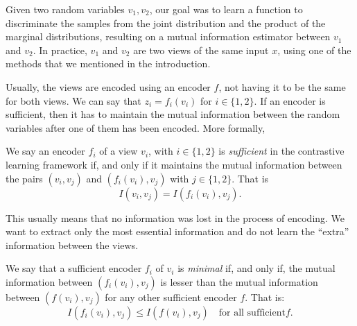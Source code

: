 Given two random variables $v_1,v_2$, our goal was to learn a function to discriminate the samples from the joint distribution and the product of the marginal distributions, resulting on a mutual information estimator between $v_1$ and $v_2$. In practice, $v_1$ and $v_2$ are two views of the same input $x$, using one of the methods that we mentioned in the introduction.

Usually, the views are encoded using an encoder $f$, not having it to be the same for both views. We can say that $z_i = f_i(v_i)$ for $i \in \{1,2\}$. If an encoder is sufficient, then it has to maintain the mutual information between the random variables after one of them has been encoded. More formally,

\begin{ndef}
We say an encoder $f_i$ of a view $v_i$, with $i \in \{1,2\}$ is \emph{sufficient} in the contrastive learning framework if, and only if it maintains the mutual information between the pairs $(v_i,v_j)$ and $(f_i(v_i),v_j)$ with $j \in \{1,2\}$. That is
\[
I(v_i,v_j) = I(f_i(v_i),v_j).    
\]
\end{ndef}
This usually means that no information was lost in the process of encoding. We want to extract only the most essential information and do not learn the ``extra'' information between the views.
\begin{ndef}
We say that a sufficient encoder $f_i$ of $v_i$ is \emph{minimal} if, and only if, the mutual information between $(f_i(v_i),v_j)$ is lesser than the mutual information between $(f(v_i),v_j)$ for any other sufficient encoder $f$. That is:
\[
I(f_i(v_i),v_j) \leq I(f(v_i),v_j) \quad \text{for all sufficient} f. 
\]
\end{ndef}




